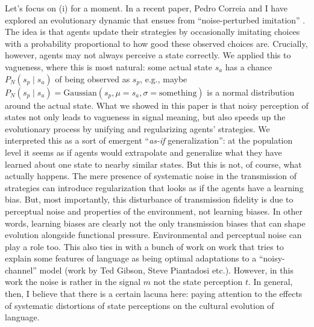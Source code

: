 \documentclass[fleqn,reqno,10pt]{article}
\begin{document}
Let's focus on (i) for a moment. In a recent paper, Pedro Correia and I have explored an
evolutionary dynamic that ensues from ``noise-perturbed imitation''
\citep{FrankeCorreia2016:Vagueness-and-I}. The idea is that agents update their strategies by
occasionally imitating choices with a probability proportional to how good these observed
choices are. Crucially, however, agents may not always perceive a state correctly. We applied
this to vagueness, where this is most natural: some actual state $s_a$ has a chance
$P_N(s_p \mid s_a)$ of being observed as $s_p$, e.g., maybe
$P_N(s_p \mid s_a) = \text{Gaussian}(s_p, \mu = s_a, \sigma = \text{something})$ is a normal
distribution around the actual state. What we showed in this paper is that noisy perception of
states not only leads to vagueness in signal meaning, but also speeds up the evolutionary
process by unifying and regularizing agents' strategies. We interpreted this as a sort of
emergent ``\emph{as-if} generalization'': at the population level it seems as if agents would
extrapolate and generalize what they have learned about one state to nearby similar states. But
this is not, of course, what actually happens. The mere presence of systematic noise in the
transmission of strategies can introduce regularization that looks as if the agents have a
learning bias. But, most importantly, this disturbance of transmission fidelity is due to
perceptual noise and properties of the environment, not learning biases. In other words,
learning biases are clearly not the only transmission biases that can shape evolution alongside
functional pressure. Environmental and perceptual noise can play a role too. This also
  ties in with a bunch of work on work that tries to explain some features of language as being
  optimal adaptations to a ``noisy-channel'' model (work by Ted Gibson, Steve Piantadosi
  etc.). However, in this work the noise is rather in the signal $m$ not the state perception
  $t$. In general, then, I believe that there is a certain lacuna here: paying attention to
  the effects of systematic distortions of state perceptions on the cultural evolution of
  language. 
\end{document}
